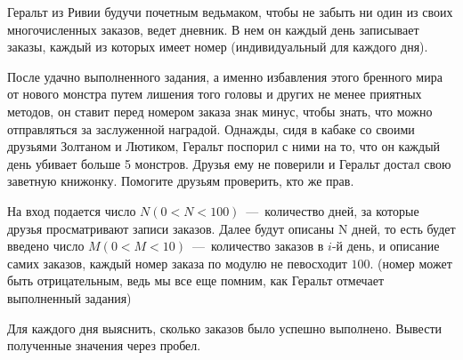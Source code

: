 
Геральт из Ривии будучи почетным ведьмаком, чтобы не забыть ни один из своих многочисленных заказов, ведет дневник. 
В нем он каждый день записывает заказы, каждый из которых имеет номер (индивидуальный для каждого дня). 

После удачно выполненного задания, а именно избавления этого бренного мира от нового монстра путем лишения того головы и других не менее приятных методов, 
он ставит перед номером заказа знак минус, чтобы знать, что можно отправляться за заслуженной наградой. 
Однажды, сидя в кабаке со своими друзьями Золтаном и Лютиком, Геральт поспорил с ними на то, что он каждый день убивает больше 5 монстров. Друзья ему не поверили и 
Геральт достал свою заветную книжонку. Помогите друзьям проверить, кто же прав.

\InputFile
\noindent
На вход подается число $N (0 < N < 100)$~---~количество дней, за которые друзья просматривают записи заказов. 
Далее будут описаны N дней, то есть будет введено число $M (0 < M < 10)$~---~количество заказов в $i$-й день, 
и описание самих заказов, каждый номер заказа по модулю не певосходит $100$. (номер может быть отрицательным, ведь мы все еще помним, как Геральт отмечает выполненный задания)

\OutputFile
Для каждого дня выяснить, сколько заказов было успешно выполнено. Вывести полученные значения через пробел.

\SAMPLES

